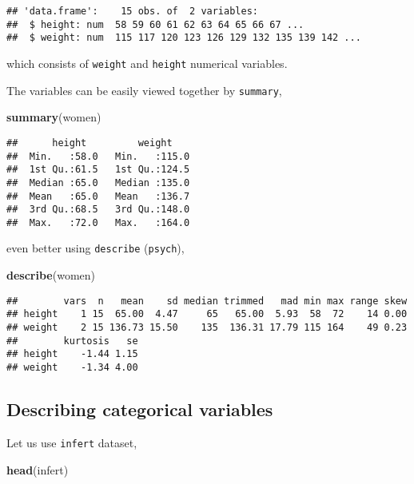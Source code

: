 \documentclass[]{book}
\newenvironment{Shaded}{\begin{snugshade}}{\end{snugshade}}
\newcommand{\KeywordTok}[1]{\textcolor[rgb]{0.13,0.29,0.53}{\textbf{{#1}}}}
\newcommand{\NormalTok}[1]{{#1}}
\theoremstyle{definition}
\theoremstyle{definition}
\theoremstyle{remark}
\begin{document}
\begin{verbatim}
## 'data.frame':    15 obs. of  2 variables:
##  $ height: num  58 59 60 61 62 63 64 65 66 67 ...
##  $ weight: num  115 117 120 123 126 129 132 135 139 142 ...
\end{verbatim}

which consists of \texttt{weight} and \texttt{height} numerical
variables.

The variables can be easily viewed together by \texttt{summary},

\begin{Shaded}
\begin{Highlighting}[]
\KeywordTok{summary}\NormalTok{(women)}
\end{Highlighting}
\end{Shaded}

\begin{verbatim}
##      height         weight     
##  Min.   :58.0   Min.   :115.0  
##  1st Qu.:61.5   1st Qu.:124.5  
##  Median :65.0   Median :135.0  
##  Mean   :65.0   Mean   :136.7  
##  3rd Qu.:68.5   3rd Qu.:148.0  
##  Max.   :72.0   Max.   :164.0
\end{verbatim}

even better using \texttt{describe} (\texttt{psych}),

\begin{Shaded}
\begin{Highlighting}[]
\KeywordTok{describe}\NormalTok{(women)}
\end{Highlighting}
\end{Shaded}

\begin{verbatim}
##        vars  n   mean    sd median trimmed   mad min max range skew
## height    1 15  65.00  4.47     65   65.00  5.93  58  72    14 0.00
## weight    2 15 136.73 15.50    135  136.31 17.79 115 164    49 0.23
##        kurtosis   se
## height    -1.44 1.15
## weight    -1.34 4.00
\end{verbatim}

\subsection{Describing categorical
variables}\label{describing-categorical-variables}

Let us use \texttt{infert} dataset,

\begin{Shaded}
\begin{Highlighting}[]
\KeywordTok{head}\NormalTok{(infert)}
\end{Highlighting}
\end{Shaded}
\end{document}
